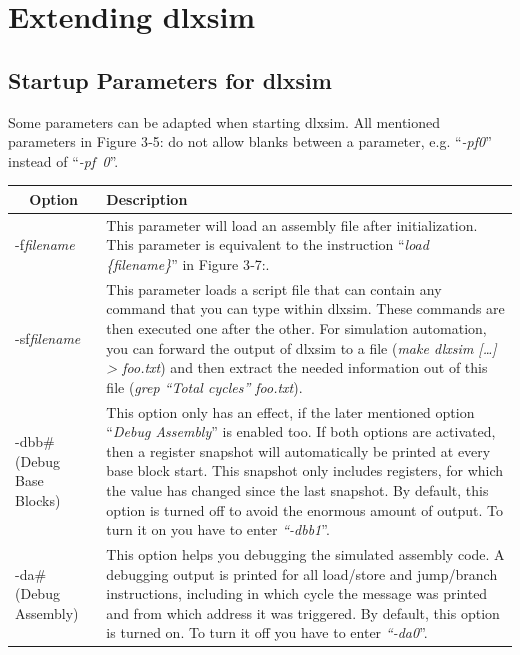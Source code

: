 \hypertarget{extending-dlxsim}{%
\section{Extending dlxsim}\label{extending-dlxsim}}
\hypertarget{startup-parameters-for-dlxsim}{%
\subsection{Startup Parameters for
dlxsim}\label{startup-parameters-for-dlxsim}}
Some parameters can be adapted when starting dlxsim. All mentioned
parameters in Figure 3‑5: do not allow blanks between a parameter, e.g.
``\emph{-pf0}'' instead of ``\emph{-pf~0}''.
\begin{table}[!htb]
	\centering
	\begin{tabular}{|p{3cm}|p{13cm}|}
		\hline
		\multicolumn{1}{|c|}{\textbf{Option}} & \textbf{Description}                                                               \\ \hline
		-f\emph{filename} & This parameter will load an assembly file after
		initialization. This parameter is equivalent to the instruction
		``\emph{load \{filename\}}'' in Figure 3‑7:.\\\hline
		-sf\emph{filename} & This parameter loads a script file that can contain
		any command that you can type within dlxsim. These commands are then
		executed one after the other. For simulation automation, you can forward
		the output of dlxsim to a file (\emph{make dlxsim {[}\ldots{]}
			\textgreater{} foo.txt}) and then extract the needed information out of
		this file (\emph{grep ``Total cycles'' foo.txt}).\\\hline
		-dbb\# (Debug Base Blocks)
		& This option only has an effect, if the later mentioned option
		``\emph{Debug Assembly}'' is enabled too. If both options are activated,
		then a register snapshot will automatically be printed at every base
		block start. This snapshot only includes registers, for which the value
		has changed since the last snapshot. By default, this option is turned
		off to avoid the enormous amount of output. To turn it on you have to
		enter \emph{``-dbb1}''.\\\hline
		-da\# (Debug Assembly) & 
		This option helps you debugging the simulated assembly code. A debugging
		output is printed for all load/store and jump/branch instructions,
		including in which cycle the message was printed and from which address
		it was triggered. By default, this option is turned on. To turn it off
		you have to enter \emph{``-da0}''.\\\hline

\end{tabular}
\end{table}
